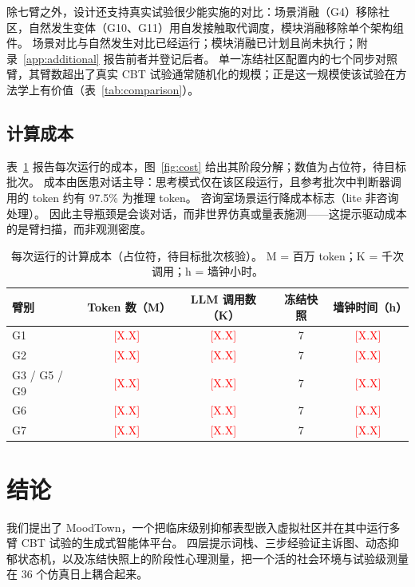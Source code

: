\documentclass[11pt,a4paper]{article}
\newcommand{\ph}[1]{\textcolor{red}{[#1]}}
\newcommand{\sys}{MoodTown}
\begin{document}
除七臂之外，设计还支持真实试验很少能实施的对比：场景消融（G4）移除社区，自然发生变体（G10、G11）用自发接触取代调度，模块消融移除单个架构组件。
场景对比与自然发生对比已经运行；模块消融已计划且尚未执行；附录~\ref{app:additional} 报告前者并登记后者。
单一冻结社区配置内的七个同步对照臂，其臂数超出了真实 CBT 试验通常随机化的规模；正是这一规模使该试验在方法学上有价值（表~\ref{tab:comparison}）。

\subsection{计算成本}\label{sec:cost}

表~\ref{tab:cost} 报告每次运行的成本，图~\ref{fig:cost} 给出其阶段分解；数值为占位符，待目标批次。
成本由医患对话主导：思考模式仅在该区段运行，且参考批次中判断器调用的 token 约有 97.5\% 为推理 token。
咨询室场景运行降成本标志（lite 非咨询处理）。
因此主导瓶颈是会谈对话，而非世界仿真或量表施测——这提示驱动成本的是臂扫描，而非观测密度。

\begin{table}[t]
\centering
\caption{每次运行的计算成本（占位符，待目标批次核验）。
M = 百万 token；K = 千次调用；h = 墙钟小时。}
\label{tab:cost}
\small
\begin{tabular}{@{}lcccc@{}}
\toprule
臂别 & Token 数（M） & LLM 调用数（K） & 冻结快照 & 墙钟时间（h） \\
\midrule
G1 & \ph{X.X} & \ph{X.X} & 7 & \ph{X.X} \\
G2 & \ph{X.X} & \ph{X.X} & 7 & \ph{X.X} \\
G3 / G5 / G9 & \ph{X.X} & \ph{X.X} & 7 & \ph{X.X} \\
G6 & \ph{X.X} & \ph{X.X} & 7 & \ph{X.X} \\
G7 & \ph{X.X} & \ph{X.X} & 7 & \ph{X.X} \\
\bottomrule
\end{tabular}
\end{table}

\section{结论}\label{sec:conclusion}

我们提出了 \sys，一个把临床级别抑郁表型嵌入虚拟社区并在其中运行多臂 CBT 试验的生成式智能体平台。
四层提示词栈、三步经验证主诉图、动态抑郁状态机，以及冻结快照上的阶段性心理测量，把一个活的社会环境与试验级测量在 36 个仿真日上耦合起来。
\end{document}
